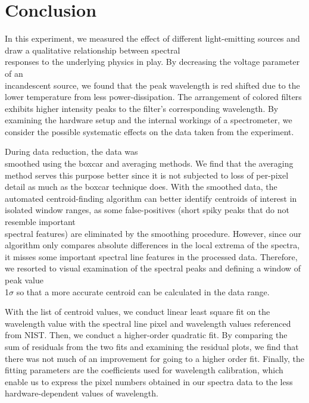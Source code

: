 \documentclass[authoryear,12pt,5p,times]{elsarticle}
\newcommand{\rpm}{\raisebox{.2ex}{$\scriptstyle\pm$}}
\begin{document}
\section{Conclusion}
In this experiment, we measured the effect of different light-emitting sources and draw a qualitative relationship between spectral \\responses to the underlying physics in play. By decreasing the voltage parameter of an \\ incandescent source, we found that the peak wavelength is red shifted due to the lower temperature from less power-dissipation. The arrangement of colored filters exhibits higher intensity peaks to the filter's corresponding wavelength. By examining the hardware setup and the internal workings of a spectrometer, we consider the possible systematic effects on the data taken from the experiment. 

During data reduction, the data was \\ smoothed using the boxcar and averaging methods. We find that the averaging method serves this purpose better since it is not subjected to loss of per-pixel detail as much as the boxcar technique does. With the smoothed data, the automated centroid-finding algorithm can better identify centroids of interest in isolated window ranges, as some false-positives (short spiky peaks that do not resemble important \\ spectral features) are eliminated by the smoothing procedure. However, since our algorithm only compares absolute differences in the local extrema of the spectra, it misses some important spectral line features in the  processed data. Therefore, we resorted to visual examination of the spectral peaks and defining a window of peak value\\
\rpm 1$\sigma$ so that a more accurate centroid can be calculated in the data range.

With the list of centroid values, we conduct linear least square fit on the wavelength value with the  spectral line pixel and wavelength values referenced from NIST. Then, we conduct a higher-order quadratic fit. By comparing the sum of residuals from the two fits and examining the residual plots, we find that there was not much of an improvement for going to a higher order fit. Finally, the fitting parameters are the coefficients used for wavelength calibration, which enable us to express the pixel numbers obtained in our spectra data to the less hardware-dependent values of wavelength.
	
\end{document}
